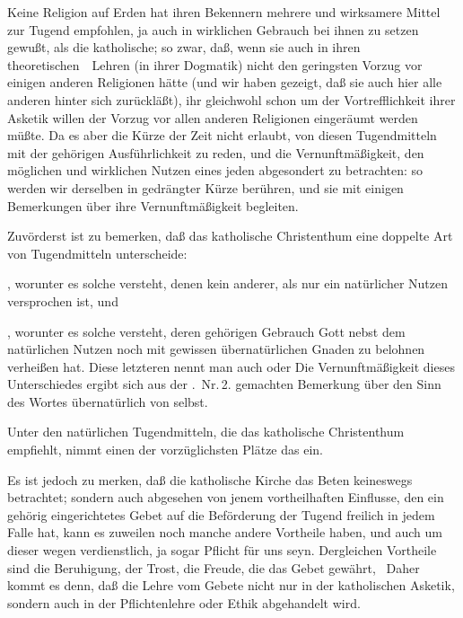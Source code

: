 Keine Religion auf Erden hat ihren Bekennern mehrere und wirksamere Mittel zur Tugend empfohlen, ja auch in wirklichen Gebrauch bei ihnen zu setzen gewußt, als die katholische; so zwar, daß, wenn sie auch in ihren theoretischen~\ Lehren (in ihrer Dogmatik) nicht den geringsten Vorzug vor einigen anderen Religionen hätte (und wir haben gezeigt, daß sie auch hier alle anderen hinter sich zurückläßt), ihr gleichwohl schon um der Vortrefflichkeit ihrer Asketik willen der Vorzug vor allen anderen Religionen eingeräumt werden müßte. Da es aber die Kürze der Zeit nicht erlaubt, von diesen Tugendmitteln mit der gehörigen Ausführlichkeit zu reden, und die Vernunftmäßigkeit, den möglichen und wirklichen Nutzen eines jeden abgesondert zu betrachten: so werden wir  derselben in gedrängter Kürze berühren, und sie mit einigen Bemerkungen über ihre Vernunftmäßigkeit begleiten.\par
Zuvörderst ist zu bemerken, daß das katholische Christenthum eine doppelte Art von Tugendmitteln unterscheide:
\begin{aufzb}
\item {}, worunter es solche versteht, denen kein anderer, als nur ein natürlicher Nutzen versprochen ist, und
\item {}, worunter es solche versteht, deren gehörigen Gebrauch Gott nebst dem natürlichen Nutzen noch mit gewissen übernatürlichen Gnaden zu belohnen verheißen hat. Diese letzteren nennt man auch  oder  Die Vernunftmäßigkeit dieses Unterschiedes ergibt sich aus der .\ Nr.\,2. gemachten Bemerkung über den Sinn des Wortes übernatürlich von selbst.
\end{aufzb}
Unter den natürlichen Tugendmitteln, die das katholische Christenthum empfiehlt, nimmt einen der vorzüglichsten Plätze das  ein.\par
Es ist jedoch zu merken, daß die katholische Kirche das Beten keineswegs  betrachtet; sondern auch abgesehen von jenem vortheilhaften Einflusse, den ein gehörig eingerichtetes Gebet auf die Beförderung der Tugend freilich in jedem Falle hat, kann es zuweilen noch manche andere Vortheile haben, und auch um dieser wegen verdienstlich, ja sogar Pflicht für uns seyn. Dergleichen Vortheile sind die Beruhigung, der Trost, die Freude, die das Gebet gewährt, \usw\ Daher kommt es denn, daß die Lehre vom Gebete nicht nur in der katholischen Asketik, sondern auch in der Pflichtenlehre oder Ethik abgehandelt wird.~
